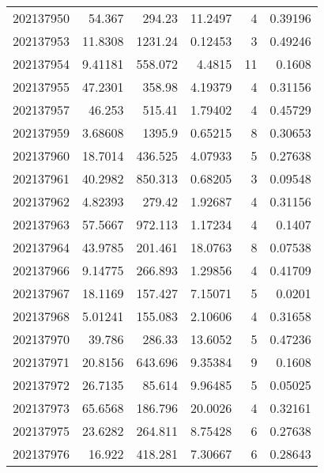 \begin{tabular}{rrrrrr}
 202137950 &         54.367   &      294.23   &           11.2497  &           4 & 0.39196 \\
 202137953 &         11.8308  &     1231.24   &            0.12453 &           3 & 0.49246 \\
 202137954 &          9.41181 &      558.072  &            4.4815  &          11 & 0.1608  \\
 202137955 &         47.2301  &      358.98   &            4.19379 &           4 & 0.31156 \\
 202137957 &         46.253   &      515.41   &            1.79402 &           4 & 0.45729 \\
 202137959 &          3.68608 &     1395.9    &            0.65215 &           8 & 0.30653 \\
 202137960 &         18.7014  &      436.525  &            4.07933 &           5 & 0.27638 \\
 202137961 &         40.2982  &      850.313  &            0.68205 &           3 & 0.09548 \\
 202137962 &          4.82393 &      279.42   &            1.92687 &           4 & 0.31156 \\
 202137963 &         57.5667  &      972.113  &            1.17234 &           4 & 0.1407  \\
 202137964 &         43.9785  &      201.461  &           18.0763  &           8 & 0.07538 \\
 202137966 &          9.14775 &      266.893  &            1.29856 &           4 & 0.41709 \\
 202137967 &         18.1169  &      157.427  &            7.15071 &           5 & 0.0201  \\
 202137968 &          5.01241 &      155.083  &            2.10606 &           4 & 0.31658 \\
 202137970 &         39.786   &      286.33   &           13.6052  &           5 & 0.47236 \\
 202137971 &         20.8156  &      643.696  &            9.35384 &           9 & 0.1608  \\
 202137972 &         26.7135  &       85.614  &            9.96485 &           5 & 0.05025 \\
 202137973 &         65.6568  &      186.796  &           20.0026  &           4 & 0.32161 \\
 202137975 &         23.6282  &      264.811  &            8.75428 &           6 & 0.27638 \\
 202137976 &         16.922   &      418.281  &            7.30667 &           6 & 0.28643 \\

\end{tabular}

